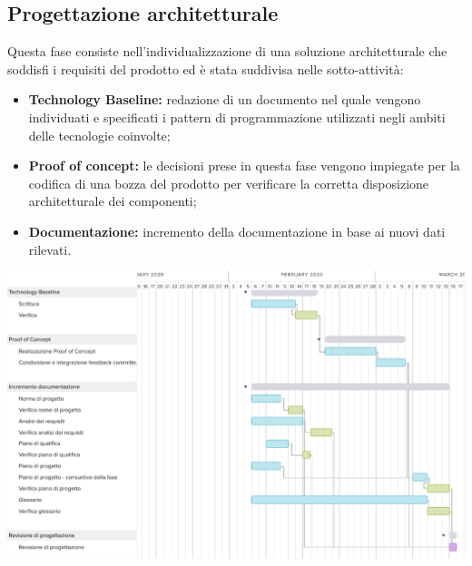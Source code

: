 \subsection{Progettazione architetturale}
Questa fase consiste nell'individualizzazione di una soluzione architetturale che soddisfi i requisiti del prodotto ed è stata suddivisa nelle sotto-attività:
\begin{itemize}
	\item \textbf{Technology Baseline:} redazione di un documento nel quale vengono individuati e specificati i pattern di programmazione utilizzati negli ambiti delle tecnologie coinvolte;
	\item  \textbf{Proof of concept:} le decisioni prese in questa fase vengono impiegate per la codifica di una bozza del prodotto per verificare la corretta disposizione architetturale dei componenti;
	\item \textbf{Documentazione:} incremento della documentazione in base ai nuovi dati rilevati.
\end{itemize}
\includegraphics[width=\textwidth]{res/img/g3}
